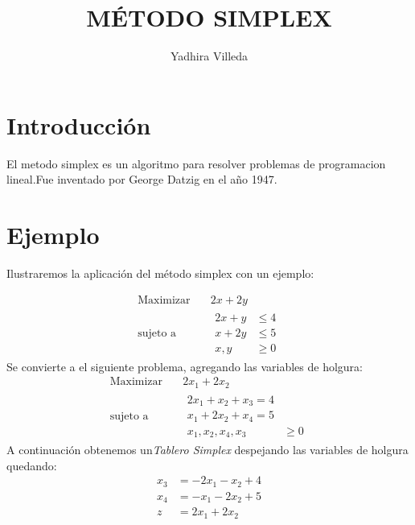 \documentclass{article}
\title{MÉTODO SIMPLEX}
\author{Yadhira Villeda}
\begin{document}
\maketitle
\section{Introducción}
\label{sec:introduccion}

El metodo simplex es un algoritmo para resolver problemas de
programacion lineal.Fue inventado por George Datzig en el año 1947.

\section{Ejemplo}
\label{sec:ejemplo}
Ilustraremos la aplicación del método simplex con  un ejemplo:

\begin{equation*}
  \begin{aligned}
    \text{Maximizar} \quad &2x+2y\\
    \text{sujeto a}\quad &
    \begin{aligned}
      2x+y &\leq 4\\
      x+2y &\leq 5 \\
       x,y &\geq 0
    \end{aligned}
  \end{aligned}
\end{equation*}
Se convierte a el siguiente problema, agregando las variables de
holgura:\\

\begin{equation*}
  \begin{aligned}
    \text{Maximizar} \quad &2x_1+2x_2\\
    \text{sujeto a}\quad &
    \begin{aligned}
      2x_1+x_2+x_3 = 4\\
      x_1+2x_2+x_4= 5 \\
       x_1,x_2,x_4,x_3 &\geq 0
    \end{aligned}
  \end{aligned}
\end{equation*}
A continuación obtenemos un\emph{Tablero Simplex} despejando las variables
de holgura quedando:\\

\begin{equation*}
   \begin{aligned}
     x_3 &=-2x_1-x_2 +4\\
     x_4 &=-x_1-2x_2+ 5 \\
     \hline
     z &=2x_1+2x_2
    \end{aligned}
\end{equation*}
\end{document}
